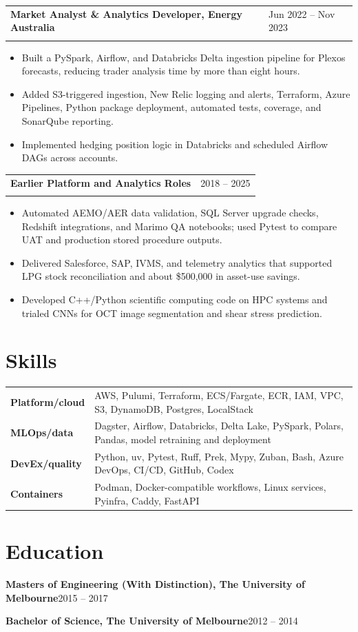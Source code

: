 \documentclass[10pt,a4paper]{article}
\makeatletter
\newcommand{\resumesection}[1]{\section*{#1}}
\newenvironment{resumejob}[3]{
  \par\addvspace{0.28em}
  \noindent\begin{tabularx}{\textwidth}{@{}>{\raggedright\arraybackslash}X>{\raggedleft\arraybackslash}p{0.28\textwidth}@{}}
    \textbf{\textcolor{textdark}{#1}} & \textcolor{mutedtext}{#2} \\
    \multicolumn{2}{@{}l@{}}{\textit{\textcolor{mutedtext}{#3}}}
  \end{tabularx}
  \vspace{-0.62em}
}{
  \par\addvspace{0.06em}
}
\makeatother
\begin{document}
\begin{resumejob}{Market Analyst \& Analytics Developer, Energy Australia}{Jun 2022 -- Nov 2023}{Trading Data \& Systems}
\begin{itemize}
  \item Built a PySpark, Airflow, and Databricks Delta ingestion pipeline for Plexos forecasts, reducing trader analysis time by more than eight hours.
  \item Added S3-triggered ingestion, New Relic logging and alerts, Terraform, Azure Pipelines, Python package deployment, automated tests, coverage, and SonarQube reporting.
  \item Implemented hedging position logic in Databricks and scheduled Airflow DAGs across accounts.
\end{itemize}
\end{resumejob}

\begin{resumejob}{Earlier Platform and Analytics Roles}{2018 -- 2025}{AEMO Gas, Origin Energy, University of Melbourne}
\begin{itemize}
  \item Automated AEMO/AER data validation, SQL Server upgrade checks, Redshift integrations, and Marimo QA notebooks; used Pytest to compare UAT and production stored procedure outputs.
  \item Delivered Salesforce, SAP, IVMS, and telemetry analytics that supported LPG stock reconciliation and about \$500,000 in asset-use savings.
  \item Developed C++/Python scientific computing code on HPC systems and trialed CNNs for OCT image segmentation and shear stress prediction.
\end{itemize}
\end{resumejob}

\resumesection{Skills}
\begin{tabularx}{\textwidth}{@{}>{\bfseries\color{textdark}}lX@{}}
Platform/cloud & AWS, Pulumi, Terraform, ECS/Fargate, ECR, IAM, VPC, S3, DynamoDB, Postgres, LocalStack \\
MLOps/data & Dagster, Airflow, Databricks, Delta Lake, PySpark, Polars, Pandas, model retraining and deployment \\
DevEx/quality & Python, uv, Pytest, Ruff, Prek, Mypy, Zuban, Bash, Azure DevOps, CI/CD, GitHub, Codex \\
Containers & Podman, Docker-compatible workflows, Linux services, Pyinfra, Caddy, FastAPI \\
\end{tabularx}

\resumesection{Education}
\textbf{Masters of Engineering (With Distinction), The University of Melbourne}\hfill 2015 -- 2017\par
\textbf{Bachelor of Science, The University of Melbourne}\hfill 2012 -- 2014
\end{document}
